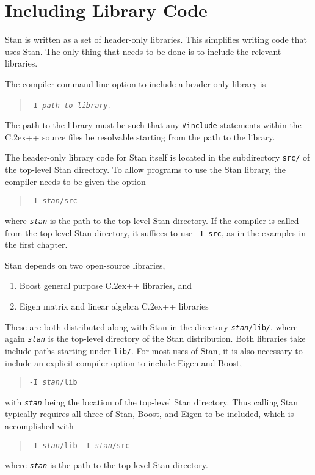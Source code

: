 \documentclass[10pt]{report}
\newcommand{\Stan}{Stan\xspace}
\newcommand*{\Cpp}{C\raise.2ex\hbox{\footnotesize ++}\xspace} %
\newcommand{\code}[1]{{\tt #1}}
\begin{document}
\section{Including Library Code}

\Stan is written as a set of header-only libraries.  This simplifies
writing code that uses Stan.  The only thing that needs to be done
is to include the relevant libraries.  

The compiler command-line option to include a
header-only library is 
%
\begin{quote}
\code{-I {\slshape path-to-library}}.
\end{quote}
%
The path to the library must be such that any \code{\#include}
statements within the \Cpp source files be resolvable starting from
the path to the library.  

The header-only library code for \Stan itself is located in the
subdirectory \code{src/} of the top-level \Stan directory.  To allow
programs to use the \Stan library, the compiler needs to be given the
option 
%
\begin{quote}
\code{-I {\slshape stan}/src} 
\end{quote}
%
where \code{\slshape stan} is the
path to the top-level Stan directory.  If the compiler is called from the
top-level Stan directory, it suffices to use \code{-I src}, as in the
examples in the first chapter.

\Stan depends on two open-source libraries,
%
\begin{enumerate}
\item Boost general purpose \Cpp libraries, and 
\item Eigen matrix and linear algebra \Cpp libraries
\end{enumerate}
%
These are both distributed along with \Stan in the directory
\code{{\slshape stan}/lib/}, where again \code{\slshape stan} is the
top-level directory of the \Stan distribution.  Both libraries take
include paths starting under \code{lib/}.  For most uses of \Stan, it
is also necessary to include an explicit compiler option to include
Eigen and Boost,
%
\begin{quote}
\code{-I {\slshape stan}/lib}
\end{quote}
%
with \code{\slshape stan} being the location of the top-level \Stan
directory.  Thus calling \Stan typically requires all three of \Stan,
Boost, and Eigen to be included, which is accomplished with
%
\begin{quote}
\code{-I {\slshape stan}/lib -I {\slshape stan}/src}
\end{quote}
%
where \code{\slshape stan} is the path to the top-level \Stan directory.
\end{document}
